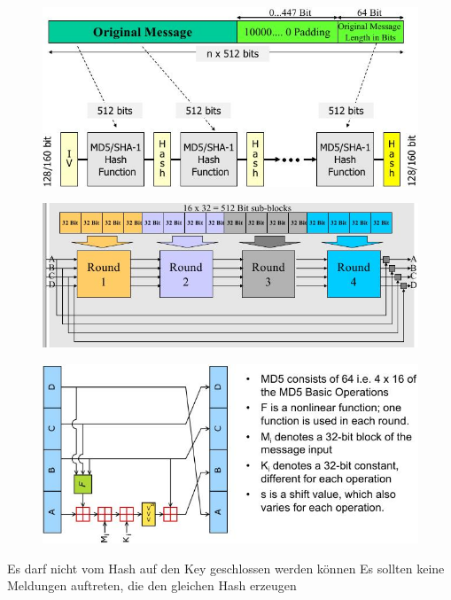 \documentclass[ngerman,a4paper,12pt]{scrreprt}
\begin{document}
\begin{figure}[H]
	\centering
	\includegraphics[width=\textwidth]{img/V6.2.jpg}
	\label{}
\end{figure}
\begin{figure}[H]
	\centering
	\includegraphics[width=\textwidth]{img/V6.3.jpg}
	\label{}
\end{figure}
\begin{figure}[H]
	\centering
	\includegraphics[width=\textwidth]{img/V6.4.jpg}
	\label{}
\end{figure}
\ul
	\li Es darf nicht vom Hash auf den Key geschlossen werden können
	\li Es sollten keine Meldungen auftreten, die den gleichen Hash erzeugen
\ulE
\end{document}
